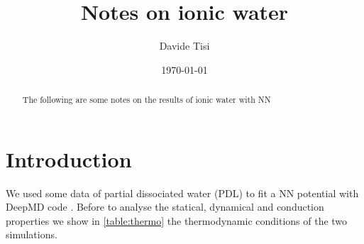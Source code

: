 \documentclass[%
 reprint,
 amsmath,amssymb,
 aps,
prb,
]{revtex4-2}
\begin{document}

\title{Notes on ionic water}%


\newcommand{\ai}{\textit{ab initio} }

\author{Davide Tisi}%
%



\newcommand{\FS}{F^{\star}}

\date{\today}%

\begin{abstract}
The following are some notes on the results of ionic water with NN
\end{abstract}

\maketitle

\section{Introduction}
We used some data of partial dissociated water (PDL) to fit a NN potential with DeepMD code \cite{Linfeng2018,Wang2017}. Before to analyse the statical, dynamical and conduction properties we show  in \cref{table:thermo} the thermodynamic conditions of the two simulations.
\end{document}
